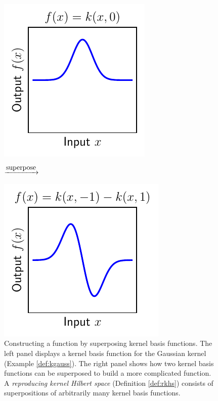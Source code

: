 \begin{refsection}
\begin{figure}
    \centering
    \begin{minipage}[c]{0.38\textwidth}
    \includegraphics{figures/single_k.pdf}
    \end{minipage}
    \begin{minipage}[c]{0.22\textwidth}
    \begin{center}
        \Huge $\xrightarrow{\text{\normalsize superpose}}\;$
    \end{center}
    \end{minipage}
    \begin{minipage}[c]{0.38\textwidth}
    \includegraphics{figures/multi_k.pdf}
    \end{minipage}
    \caption[Constructing a function by superposing kernel basis functions]{Constructing a function by superposing kernel basis functions. The left panel displays a kernel basis function for the Gaussian kernel (Example \ref{def:kgauss}). The right panel shows how two kernel basis functions can be superposed to build a more complicated function. A \textit{reproducing kernel Hilbert space} (Definition \ref{def:rkhs}) consists of superpositions of arbitrarily many kernel basis functions.}
    \label{fig:kernel}
\end{figure}


\end{refsection}
